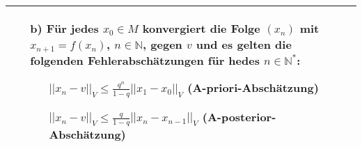 \begin{table}[H]
\begin{tabularx}{\textwidth}{X m{16cm}}
\begin{itemize}
                \item[b)] Für jedes $x_0 \in M$ konvergiert die Folge $(x_n)$ mit $x_{n+1} = f(x_n)$, $n \in \mathbb{N}$, gegen $v$
                            und es gelten die folgenden Fehlerabschätzungen für hedes $n \in \mathbb{N^*}$:
                            \begin{itemize}
                                \item[] $||x_n-v||_V \leq \frac{q^n}{1-q}||x_1-x_0||_V$ (A-priori-Abschätzung)
                                \item[] $||x_n-v||_V \leq \frac{q}{1-q}||x_n-x_{n-1}||_V$ (A-posterior-Abschätzung)
                            \end{itemize}
            \end{itemize} \\

    \bottomrule
\end{tabularx}
\end{table}

